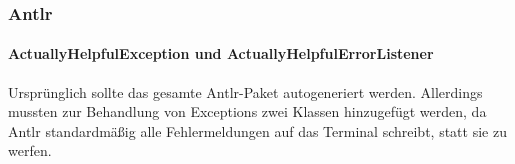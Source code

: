 \documentclass[parskip=full]{scrartcl}
\begin{document}
\subsubsection{Antlr}
\paragraph{ActuallyHelpfulException und ActuallyHelpfulErrorListener}
Ursprünglich sollte das gesamte Antlr-Paket autogeneriert werden. Allerdings mussten zur Behandlung von Exceptions zwei Klassen hinzugefügt werden, da Antlr standardmäßig alle Fehlermeldungen auf das Terminal schreibt, statt sie zu werfen.

 
\end{document}
